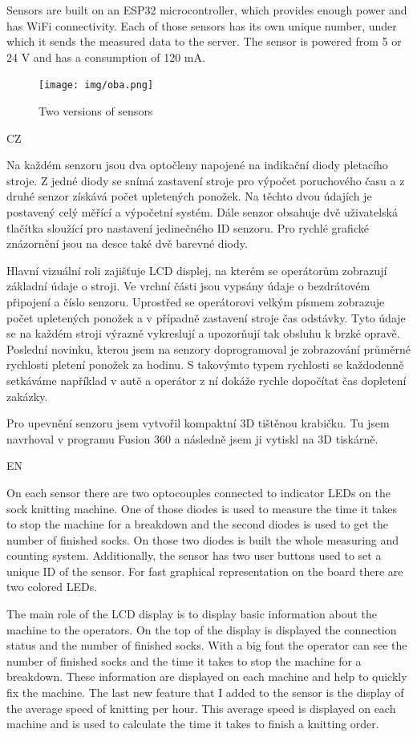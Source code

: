 \documentclass[12pt, a4paper]{article}
\begin{document}
Sensors are built on an ESP32 microcontroller, which provides enough power and has WiFi connectivity.
Each of those sensors has its own unique number, under which it sends the measured data to the server.
The sensor is powered from 5 or 24 V and has a consumption of 120 mA.

\begin{figure}[t]
    \centering
    \texttt{[image: img/oba.png]}
    \caption{Two versions of sensors}
    \label{fig:dveVerze}
\end{figure}

CZ

Na každém senzoru jsou dva optočleny napojené na indikační diody pletacího stroje.
Z jedné diody se snímá zastavení stroje pro výpočet poruchového času a z druhé senzor získává počet upletených ponožek.
Na těchto dvou údajích je postavený celý měřící a výpočetní systém.
Dále senzor obsahuje dvě uživatelská tlačítka sloužící pro nastavení jedinečného ID senzoru.
Pro rychlé grafické znázornění jsou na desce také dvě barevné diody.

Hlavní vizuální roli zajišťuje LCD displej, na kterém se operátorům zobrazují základní údaje o stroji.
Ve vrchní části jsou vypsány údaje o bezdrátovém připojení a číslo senzoru.
Uprostřed se operátorovi velkým písmem zobrazuje počet upletených ponožek a v případně zastavení stroje čas odstávky.
Tyto údaje se na každém stroji výrazně vykreslují a upozorňují tak obsluhu k brzké opravě.
Poslední novinku, kterou jsem na senzory doprogramoval je zobrazování průměrné rychlosti pletení ponožek za hodinu.
S takovýmto typem rychlosti se každodenně setkáváme například v autě a operátor z ní dokáže rychle dopočítat čas dopletení zakázky.

Pro upevnění senzoru jsem vytvořil kompaktní 3D tištěnou krabičku.
Tu jsem navrhoval v programu Fusion 360 a následně jsem ji vytiskl na 3D tiskárně.

EN

On each sensor there are two optocouples connected to indicator LEDs on the sock knitting machine.
One of those diodes is used to measure the time it takes to stop the machine for a breakdown and the second diodes is used to get the number of finished socks.
On those two diodes is built the whole measuring and counting system.
Additionally, the sensor has two user buttons used to set a unique ID of the sensor.
For fast graphical representation on the board there are two colored LEDs.

The main role of the LCD display is to display basic information about the machine to the operators.
On the top of the display is displayed the connection status and the number of finished socks.
With a big font the operator can see the number of finished socks and the time it takes to stop the machine for a breakdown.
These information are displayed on each machine and help to quickly fix the machine.
The last new feature that I added to the sensor is the display of the average speed of knitting per hour.
This average speed is displayed on each machine and is used to calculate the time it takes to finish a knitting order.
\end{document}
